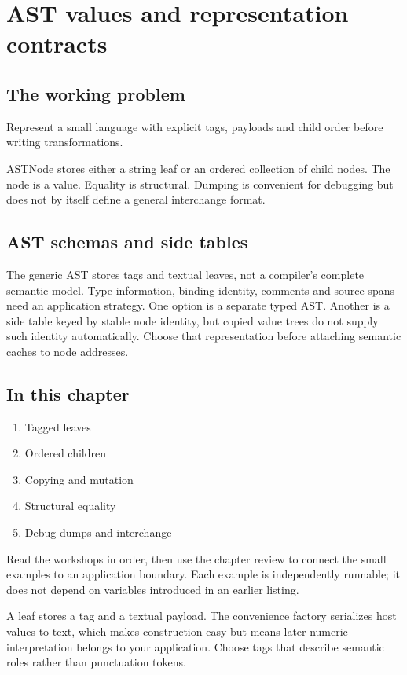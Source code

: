 \chapter{AST values and representation contracts}\label{ch:3}
\section*{The working problem}
Represent a small language with explicit tags, payloads and child order before writing transformations.

ASTNode stores either a string leaf or an ordered collection of child nodes. The node is a value. Equality is structural. Dumping is convenient for debugging but does not by itself define a general interchange format.

\section*{AST schemas and side tables}
The generic AST stores tags and textual leaves, not a compiler's complete semantic model. Type information, binding identity, comments and source spans need an application strategy. One option is a separate typed AST. Another is a side table keyed by stable node identity, but copied value trees do not supply such identity automatically. Choose that representation before attaching semantic caches to node addresses.

\section*{In this chapter}
\begin{enumerate}
\item Tagged leaves
\item Ordered children
\item Copying and mutation
\item Structural equality
\item Debug dumps and interchange
\end{enumerate}
Read the workshops in order, then use the chapter review to connect the small examples to an application boundary. Each example is independently runnable; it does not depend on variables introduced in an earlier listing.

\clearpage
{}
A leaf stores a tag and a textual payload. The convenience factory serializes host values to text, which makes construction easy but means later numeric interpretation belongs to your application. Choose tags that describe semantic roles rather than punctuation tokens.

